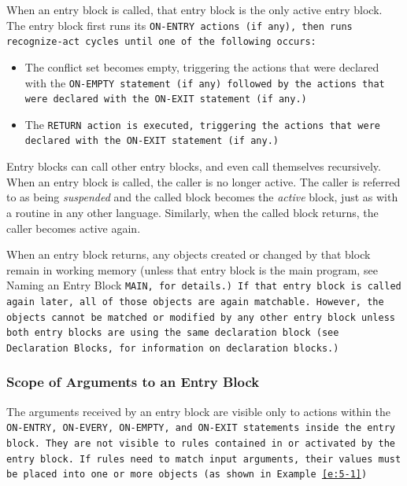 When an entry block is called, that entry block is the only active
entry block. The entry block first runs its \tt{ON-ENTRY} actions (if
any), then runs recognize-act cycles until one of the following
occurs:
\begin{itemize}
\item The conflict set becomes empty, triggering the actions that were
  declared with the \tt{ON-EMPTY} statement (if any) followed by the
  actions that were declared with the \tt{ON-EXIT} statement (if any.)
\item The \tt{RETURN} action is executed, triggering the actions that
  were declared with the \tt{ON-EXIT} statement (if any.)
\end{itemize}

Entry blocks can call other entry blocks, and even call themselves
recursively. When an entry block is called, the caller is no longer
active. The caller is referred to as being \emph{suspended} and the
called block becomes the \emph{active} block, just as with a routine
in any other language. Similarly, when the called block returns, the
caller becomes active again.

When an entry block returns, any objects created or changed by that
block remain in working memory (unless that entry block is the main
program, see Naming an Entry Block \tt{MAIN}, for details.) If
that entry block is called again later, all of those objects are again
matchable. However, the objects cannot be matched or modified by any
other entry block unless both entry blocks are using the same
declaration block (see Declaration Blocks, for information on
declaration blocks.)

\subsubsection{Scope of Arguments to an Entry Block}

The arguments received by an entry block are visible only to actions
within the \tt{ON-ENTRY}, \tt{ON-EVERY}, \tt{ON-EMPTY}, and
\tt{ON-EXIT} statements inside the entry block. They are not visible
to rules contained in or activated by the entry block. If rules need
to match input arguments, their values must be placed into one or more
objects (as shown in Example~\ref{e:5-1})

